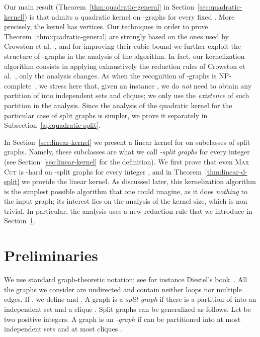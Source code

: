 \documentclass[
final
]{dmtcs-episciences}
\begin{document}
Our main result (Theorem~\ref{thm:quadratic-general} in Section~\ref{sec:quadratic-kernel}) is that {} admits a quadratic kernel on -graphs for every fixed . More precisely, the kernel has  vertices. Our techniques in order to prove Theorem~\ref{thm:quadratic-general} are strongly based on the ones used by Crowston et al.~\cite{crowston2013maximum}, and for improving their cubic bound we further exploit the structure of -graphs in the analysis of the algorithm. In fact, our kernelization algorithm consists in applying exhaustively the reduction rules of Crowston et al.~\cite{crowston2013maximum}, only the analysis changes. As when   the recognition of -graphs is {\sf NP}-complete~\cite{Bra96,FHKM03}, we stress here that, given an instance , we do {\sl not} need to obtain any partition of  into  independent sets and  cliques; we only use the {\sl existence} of such partition in the analysis. Since the analysis of the quadratic kernel for the particular case of split graphs is simpler, we prove it separately in Subsection~\ref{ap:quadratic-split}.

In Section~\ref{sec:linear-kernel} we present a linear kernel for {} on subclasses of split graphs. Namely, these subclasses are what we call \emph{-split graphs} for every integer  (see Section~\ref{sec:linear-kernel} for the definition). We first prove  that even \textsc{Max Cut} is {}-hard on -split graphs for every integer , and in Theorem~\ref{thm:linear-d-split} we provide the linear kernel. As discussed later, this kernelization algorithm is the simplest possible algorithm that one could imagine, as it does {\sl nothing} to the input graph; its interest lies on the analysis of the kernel size, which is non-trivial. In particular, the analysis uses a new reduction rule that we introduce in Section~\ref{s2}.




\section{Preliminaries}
\label{s2}
	
We use standard graph-theoretic notation; see for instance Diestel's book~\cite{Diestel05}. All the graphs we consider are undirected and contain neither loops nor multiple edges. If , we define  and . A graph  is a {\it{split graph}} if there is a partition of  into an independent set  and a clique . Split graphs can be generalized as follows. Let  be two positive integers. A graph  is an {\it{-graph}} if  can be partitioned into at most  independent sets   and at most  cliques .
\end{document}
